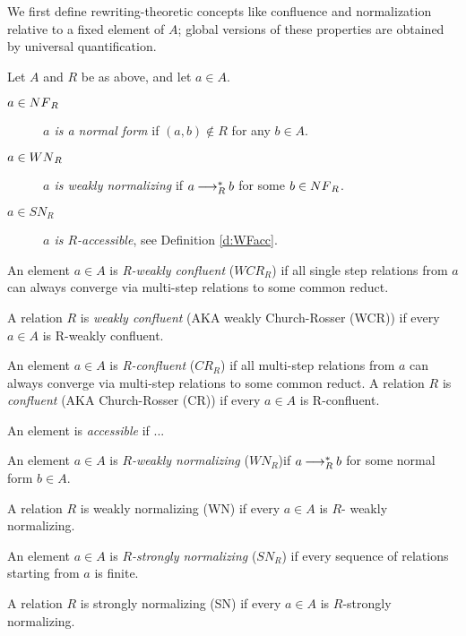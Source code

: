 We first define rewriting-theoretic concepts like confluence and normalization relative to a fixed element of $A$; global versions of these properties are obtained by universal quantification.

\begin{definition}  Let $A$ and $R$ be as above, and let $a \in A$.
  \begin{description}
    \item[$a \in \NF_R$] \emph{$a$ is a normal form} if $(a,b) \notin R$ for any $b \in A$.
    \item[$a \in \WN_R$] \emph{$a$ is weakly normalizing} if $a \mathbin{\longrightarrow_R^*} b$ for some $b \in \NF_R$.
    \item[$a \in SN_R$]  \emph{$a$ is $R$-accessible}, see Definition \ref{d:WFacc}.
  \end{description}

    An element $a \in A$ is \emph{R-weakly confluent} ($WCR_R$) if all single step relations from $a$ can always converge
    via multi-step relations to some common reduct.

    A relation $R$ is \emph{weakly confluent} (AKA weakly Church-Rosser (WCR)) if every $a \in A$ is R-weakly confluent.
\end{definition}

\begin{definition}
    An element $a \in A$ is \emph{R-confluent} ($CR_R$) if all multi-step relations from $a$ can always converge
    via multi-step relations to some common reduct.
    A relation $R$ is \emph{confluent} (AKA Church-Rosser (CR)) if every $a \in A$ is R-confluent.
\end{definition}

\begin{definition}
  \label{d:WFacc}
  An element is \emph{accessible} if ...
\end{definition}

\begin{definition}
    An element $a \in A$ is \emph{$R$-weakly normalizing} ($WN_{R}$)if $a \mathbin{\longrightarrow_R^*} b$ for some normal form $b \in A$.

    A relation $R$ is weakly normalizing (WN) if every $a \in A$ is $R$- weakly normalizing.
\end{definition}

\begin{definition}
    An element $a \in A$ is \emph{$R$-strongly normalizing} ($SN_R$) if every sequence of relations starting from $a$ is finite.

    A relation $R$ is strongly normalizing (SN) if every
    $a \in A$ is $R$-strongly normalizing.
\end{definition}

